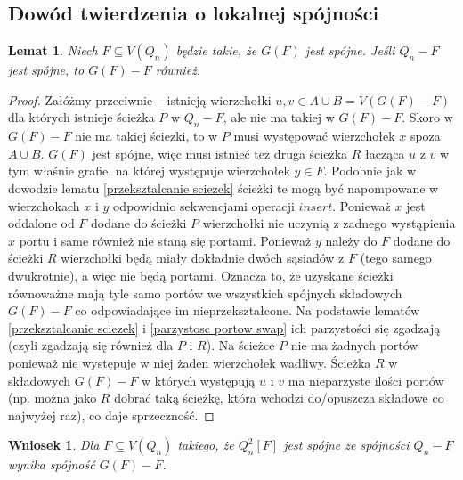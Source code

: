 \documentclass{pracamgr}
\newtheorem{lemma}[theorem]{Lemat}
\newtheorem{corollary}[theorem]{Wniosek}
\begin{document}
   \subsection{Dowód twierdzenia o lokalnej spójności}
    \begin{lemma}\label{Q_n-F spojne => G(F)-F spojne (1 skladowa)}
     Niech $F\subseteq V(Q_n)$ będzie takie, że $G(F)$ jest spójne. Jeśli $Q_n-F$ jest spójne, to $G(F)-F$ również.
    \end{lemma}
    \begin{proof}
     Załóżmy przeciwnie -- istnieją wierzchołki $u,v\in A\cup B=V(G(F)-F)$ dla których istnieje ścieżka $P$ w $Q_n-F$, ale nie ma takiej w  $G(F)-F$.
     Skoro w $G(F)-F$ nie ma takiej ściezki, to w $P$ musi występować wierzchołek $x$ spoza $A\cup B$.\newline
     $G(F)$ jest spójne, więc musi istnieć też druga ścieżka $R$ łacząca $u$ z $v$ w tym właśnie grafie, na której występuje wierzchołek $y\in F$.\newline
     Podobnie jak w dowodzie lematu \ref{przeksztalcanie sciezek} 
     ścieżki te mogą być napompowane w wierzchokach $x$ i $y$ odpowidnio sekwencjami operacji $insert$.\newline
     Ponieważ $x$ jest oddalone od $F$ dodane do ścieżki $P$ wierzchołki nie uczynią z zadnego wystąpienia $x$ portu i same również nie staną się portami.
     Ponieważ $y$ należy do $F$ dodane do ścieżki $R$ wierzchołki będą miały dokładnie dwóch sąsiadów z $F$ (tego samego dwukrotnie), a więc nie będą portami.\newline
     Oznacza to, że uzyskane ścieżki równoważne mają tyle samo portów we wszystkich spójnych składowych $G(F)-F$ co odpowiadające im nieprzekształcone.
     Na podstawie lematów \ref{przeksztalcanie sciezek} i \ref{parzystosc portow swap} ich parzystości  się zgadzają (czyli zgadzają się również dla $P$ i $R$).
     Na ścieżce $P$ nie ma żadnych portów ponieważ nie występuje w niej żaden wierzchołek wadliwy.
     Ścieżka $R$ w składowych $G(F)-F$ w których występują $u$ i $v$ ma nieparzyste ilości portów
     (np. można jako $R$ dobrać taką ścieżkę, która wchodzi do/opuszcza składowe co najwyżej raz), co daje sprzeczność.
    \end{proof}
    \begin{corollary}\label{Q_n-F spojne => Q_n^2[F]-F spojne (1 skladowa)}
     Dla $F\subseteq V(Q_n)$ takiego, że $Q_n^2[F]$ jest spójne ze spójności $Q_n-F$ wynika spójność $G(F)-F$.
    \end{corollary}
\end{document}

